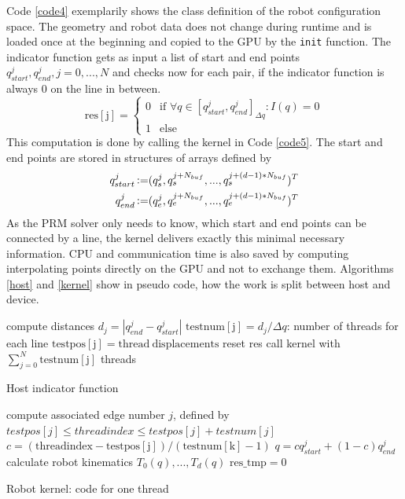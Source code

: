 \documentclass[twocolumn]{svjour3}
\DeclareMathOperator*{\defgl}{\vcentcolon=}
\newcommand{\abs}[1]{\left |#1\right |}
\begin{document}
Code \ref{code4} exemplarily shows the class definition of the robot configuration space.
The geometry and robot data does not change during runtime
and is load\-ed once at the beginning and copied to the GPU by the 
\texttt{init}
function.
The indicator function gets as input a list of start and end points $q_{start}^j, q_{end}^j, j=0,...,N$ and checks now for each pair, if the indicator function is always 0 on the line in between.
\begin{equation}
	\mathrm{res[j]}=\begin{cases}
		0	&\text{if\ \ } \forall q \in \left[q_{start}^j, q_{end}^j\right]_{\Delta q} : I(q)=0 \\
		1	&\text{else}
	\end{cases}
\end{equation}
This computation is done by calling the kernel in Code \ref{code5}.
The start and end points are stored in structures of arrays defined by
\begin{equation}
\begin{aligned}
	q_{start}^j &\defgl (q_s^j , q_s^{j+N_{buf}} , ... , q_s^{j+(d-1)*N_{buf}})^T\\
	q_{end}^j &\defgl (q_e^j , q_e^{j+N_{buf}} , ... , q_e^{j+(d-1)*N_{buf}})^T
\end{aligned}
\end{equation}
As the PRM solver only needs to know, which start and end points can be connected by a line, the kernel delivers exactly this minimal necessary information. 
CPU and communication time is also saved by computing interpolating points directly on the GPU and not to exchange them.
Algorithms \ref{host} and \ref{kernel} show in pseudo code, how the work is split between host and device.

\begin{algorithm}\label{host}
	compute distances $d_j = \abs{q_{end}^j - q_{start}^j}$ \;
	$\mathrm{testnum[j]} = d_j/{\Delta q}$: number of threads for each line \;
	$\mathrm{testpos[j]} = \mathrm{thread\ displacements}$ \;
	reset res \;
	call kernel with $\sum_{j=0}^N \mathrm{testnum[j]}$ threads \;
	\caption{Host indicator function}
\end{algorithm}

\begin{algorithm}\label{kernel}
	compute associated edge number $j$, defined by $testpos[j] \leq threadindex \le testpos[j]+testnum[j]$ \;
	$c = (\mathrm{threadindex - testpos[j]}) / (\mathrm{testnum[k]}-1) $ \;
	$q=c q_{start}^j + (1-c) q_{end}^j $ \;
	calculate robot kinematics $T_0(q), ..., T_d(q) $ \;
	$\mathrm{res\_tmp} = 0$ \;
	\caption{Robot kernel: code for one thread}
\end{algorithm}
\end{document}
